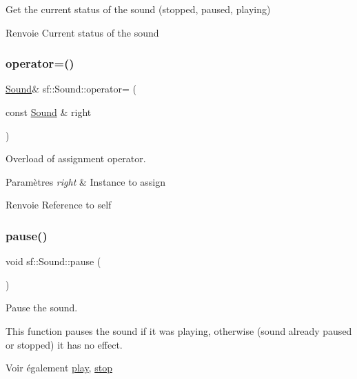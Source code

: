 Get the current status of the sound (stopped, paused, playing) 

\begin{DoxyReturn}{Renvoie}
Current status of the sound 
\end{DoxyReturn}
\mbox{\label{classsf_1_1Sound_a08c64c9c1dabeebc59fbf2540d81d4dd}} 
\subsubsection{\texorpdfstring{operator=()}{operator=()}}
{\footnotesize\ttfamily \hyperlink{classsf_1_1Sound}{Sound}\& sf\+::\+Sound\+::operator= (\begin{DoxyParamCaption}\item[{const \hyperlink{classsf_1_1Sound}{Sound} \&}]{right }\end{DoxyParamCaption})}



Overload of assignment operator. 


\begin{DoxyParams}{Paramètres}
{\em right} & Instance to assign\\
\hline
\end{DoxyParams}
\begin{DoxyReturn}{Renvoie}
Reference to self 
\end{DoxyReturn}
\mbox{\label{classsf_1_1Sound_a5eeb25815bfa8cdc4a6cc000b7b19ad5}} 
\subsubsection{\texorpdfstring{pause()}{pause()}}
{\footnotesize\ttfamily void sf\+::\+Sound\+::pause (\begin{DoxyParamCaption}{ }\end{DoxyParamCaption})}



Pause the sound. 

This function pauses the sound if it was playing, otherwise (sound already paused or stopped) it has no effect.

\begin{DoxySeeAlso}{Voir également}
\hyperlink{classsf_1_1Sound_a2953ffe632536e72e696fd880ced2532}{play}, \hyperlink{classsf_1_1Sound_aa9c91c34f7c6d344d5ee9b997511f754}{stop} 
\end{DoxySeeAlso}
\mbox{\label{classsf_1_1Sound_a2953ffe632536e72e696fd880ced2532}} 
